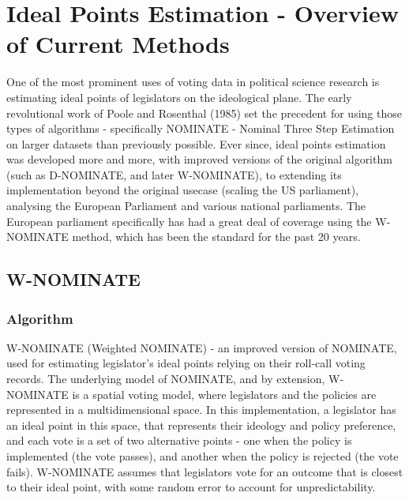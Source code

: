 \documentclass[a4paper,12pt]{report}
\begin{document}
    \chapter{Ideal Points Estimation - Overview of Current Methods}
        \label{ch:ideal-points-estimation---overview-of-current-methods}
        One of the most prominent uses of voting data in political science research is estimating ideal points of
        legislators on the ideological plane. The early revolutional work of Poole and Rosenthal (1985) set the
        precedent for using those types of algorithms - specifically NOMINATE - Nominal Three Step Estimation on
        larger datasets than previously possible. Ever since, ideal points estimation was developed more and more,
        with improved versions of the original algorithm (such as D-NOMINATE, and later W-NOMINATE), to extending
        its implementation beyond the original usecase (scaling the US parliament), analysing the European
        Parliament and various national parliaments. The European parliament specifically has had a great deal of
        coverage using the W-NOMINATE method, which has been the standard for the past 20 years.


        \section{W-NOMINATE}

            \subsection{Algorithm}

                W-NOMINATE (Weighted NOMINATE) - an improved version of NOMINATE, used for estimating legislator's
                ideal points relying on their roll-call voting records. The underlying model of NOMINATE, and by
                extension, W-NOMINATE is a spatial voting model, where legislators and the policies are represented
                in a multidimensional space. In this implementation, a legislator has an ideal point in this space,
                that represents their ideology and policy preference, and each vote is a set of two alternative
                points - one when the policy is implemented (the vote passes), and another when the policy is
                rejected (the vote fails). W-NOMINATE assumes that legislators vote for an outcome that is closest
                to their ideal point, with some random error to account for unpredictability.
\end{document}
